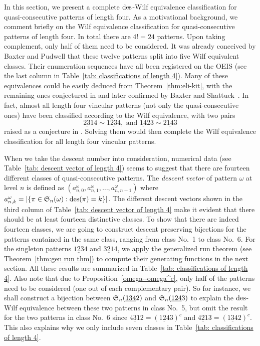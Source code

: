 
In this section, we present a complete $\des$-Wilf equivalence classification for quasi-consecutive patterns of length four. As a motivational background, we comment briefly on the Wilf equivalence classification for quasi-consecutive patterns of length four. In total there are $4!=24$ patterns. Upon taking complement, only half of them need to be considered. It was already conceived by Baxter and Pudwell \cite[Table 6]{BP12} that these twelve patterns split into five Wilf equivalent classes. Their enumeration sequences have all been registered on the OEIS (see the last column in Table~\ref{tab: classifications of length 4}). Many of these equivalences could be easily deduced from Theorem~\ref{thm:eli-kit}, with the remaining ones conjectured in \cite[Conj.~17]{BP12} and later confirmed by Baxter and Shattuck~\cite{BS15}. In fact, almost all length four vincular patterns (not only the quasi-consecutive ones) have been classified according to the Wilf equivalence, with two pairs
$$\underline{23}14\sim 1\underline{23}4,\text{ and } \underline{14}23\sim 2\underline{14}3$$
raised as a conjecture in \cite{BS15}. Solving them would then complete the Wilf equivalence classification for all length four vincular patterns.

When we take the descent number into consideration, numerical data (see Table~\ref{tab: descent vector of length 4}) seems to suggest that there are fourteen different classes of quasi-consecutive patterns. The \textit{descent vector} of pattern $\omega$ at level $n$ is defined as $(a_{n,0}^{\omega},a_{n,1}^{\omega},\ldots,a_{n,n-1}^{\omega})$
where $a_{n,k}^{\omega}=|\{\pi\in \S_n(\omega):\des(\pi)=k\}|$. The different descent vectors shown in the third column of Table~\ref{tab: descent vector of length 4} make it evident that there should be at least fourteen distinctive classes. To show that there are indeed fourteen classes, we are going to construct descent preserving bijections for the patterns contained in the same class, ranging from class No.~1 to class No.~6. For the singleton patterns $\underline{123}4$ and $\underline{321}4$, we apply the generalized run theorem (see Theorem~\ref{thm:gen run thm}) to compute their generating functions in the next section. All these results are summarized in Table~\ref{tab: classifications of length 4}. Also note that due to Proposition~\ref{omega--omega^c}, only half of the patterns need to be considered (one out of each complementary pair). So for instance, we shall construct a bijection between $\S_n(\underline{134}2)$ and $\S_n(\underline{124}3)$ to explain the $\des$-Wilf equivalence between these two patterns in class No.~5, but omit the result for the two patterns in class No.~6 since $\underline{431}2=(\underline{124}3)^c$ and $\underline{421}3=(\underline{134}2)^c$. This also explains why we only include seven classes in Table~\ref{tab: classifications of length 4}.

